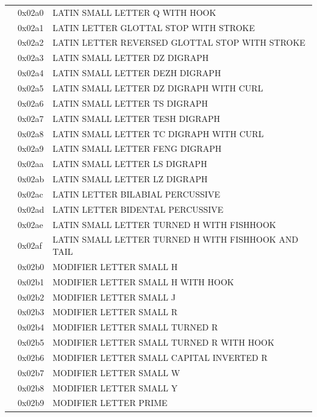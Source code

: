 \documentclass[12pt, twoside]{article}
\begin{document}
\begin{longtable}{L{1.0cm} L{2.0cm} >{\footnotesize}L{10cm}}
&0x02a0&LATIN SMALL LETTER Q WITH HOOK\\
&0x02a1&LATIN LETTER GLOTTAL STOP WITH STROKE\\
&0x02a2&LATIN LETTER REVERSED GLOTTAL STOP WITH STROKE\\
&0x02a3&LATIN SMALL LETTER DZ DIGRAPH\\
&0x02a4&LATIN SMALL LETTER DEZH DIGRAPH\\
&0x02a5&LATIN SMALL LETTER DZ DIGRAPH WITH CURL\\
&0x02a6&LATIN SMALL LETTER TS DIGRAPH\\
&0x02a7&LATIN SMALL LETTER TESH DIGRAPH\\
&0x02a8&LATIN SMALL LETTER TC DIGRAPH WITH CURL\\
&0x02a9&LATIN SMALL LETTER FENG DIGRAPH\\
&0x02aa&LATIN SMALL LETTER LS DIGRAPH\\
&0x02ab&LATIN SMALL LETTER LZ DIGRAPH\\
&0x02ac&LATIN LETTER BILABIAL PERCUSSIVE\\
&0x02ad&LATIN LETTER BIDENTAL PERCUSSIVE\\
&0x02ae&LATIN SMALL LETTER TURNED H WITH FISHHOOK\\
&0x02af&LATIN SMALL LETTER TURNED H WITH FISHHOOK AND TAIL\\
&0x02b0&MODIFIER LETTER SMALL H\\
&0x02b1&MODIFIER LETTER SMALL H WITH HOOK\\
&0x02b2&MODIFIER LETTER SMALL J\\
&0x02b3&MODIFIER LETTER SMALL R\\
&0x02b4&MODIFIER LETTER SMALL TURNED R\\
&0x02b5&MODIFIER LETTER SMALL TURNED R WITH HOOK\\
&0x02b6&MODIFIER LETTER SMALL CAPITAL INVERTED R\\
&0x02b7&MODIFIER LETTER SMALL W\\
&0x02b8&MODIFIER LETTER SMALL Y\\
&0x02b9&MODIFIER LETTER PRIME\\

\end{longtable}
\end{document}
